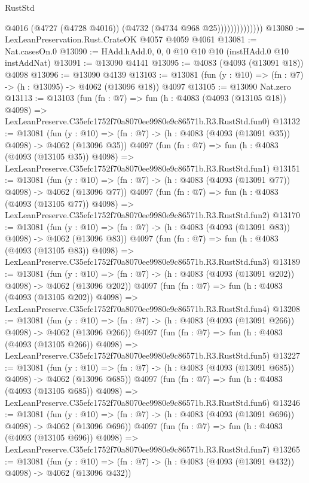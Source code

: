\begin{lexlean}{RustStd}
\begin{coremodule}
                            @4016
                            (@4727 (@4728 @4016))
                            (@4732 (@4734 @968 @25))))))))))))))
@13080 := LexLeanPreservation.Rust.CrateOK @4057 @4059 @4061
@13081 := Nat.casesOn.{0}
@13090 := HAdd.hAdd.{0, 0, 0} @10 @10 @10 (instHAdd.{0} @10 instAddNat)
@13091 := @13090 @4141
@13095 := @4083 (@4093 (@13091 @18)) @4098
@13096 := @13090 @4139
@13103 := @13081 (fun (y : @10) => (fn : @7) -> (h : @13095) -> @4062 (@13096 @18)) @4097
@13105 := @13090 Nat.zero
@13113 := @13103
    (fun (fn : @7) =>
    fun (h : @4083 (@4093 (@13105 @18)) @4098) =>
    LexLeanPreserve.C35efc1752f70a8070ee9980e9c86571b.R3.RustStd.fun0)
@13132 := @13081
    (fun (y : @10) => (fn : @7) -> (h : @4083 (@4093 (@13091 @35)) @4098) -> @4062 (@13096 @35))
    @4097
    (fun (fn : @7) =>
    fun (h : @4083 (@4093 (@13105 @35)) @4098) =>
    LexLeanPreserve.C35efc1752f70a8070ee9980e9c86571b.R3.RustStd.fun1)
@13151 := @13081
    (fun (y : @10) => (fn : @7) -> (h : @4083 (@4093 (@13091 @77)) @4098) -> @4062 (@13096 @77))
    @4097
    (fun (fn : @7) =>
    fun (h : @4083 (@4093 (@13105 @77)) @4098) =>
    LexLeanPreserve.C35efc1752f70a8070ee9980e9c86571b.R3.RustStd.fun2)
@13170 := @13081
    (fun (y : @10) => (fn : @7) -> (h : @4083 (@4093 (@13091 @83)) @4098) -> @4062 (@13096 @83))
    @4097
    (fun (fn : @7) =>
    fun (h : @4083 (@4093 (@13105 @83)) @4098) =>
    LexLeanPreserve.C35efc1752f70a8070ee9980e9c86571b.R3.RustStd.fun3)
@13189 := @13081
    (fun (y : @10) => (fn : @7) -> (h : @4083 (@4093 (@13091 @202)) @4098) -> @4062 (@13096 @202))
    @4097
    (fun (fn : @7) =>
    fun (h : @4083 (@4093 (@13105 @202)) @4098) =>
    LexLeanPreserve.C35efc1752f70a8070ee9980e9c86571b.R3.RustStd.fun4)
@13208 := @13081
    (fun (y : @10) => (fn : @7) -> (h : @4083 (@4093 (@13091 @266)) @4098) -> @4062 (@13096 @266))
    @4097
    (fun (fn : @7) =>
    fun (h : @4083 (@4093 (@13105 @266)) @4098) =>
    LexLeanPreserve.C35efc1752f70a8070ee9980e9c86571b.R3.RustStd.fun5)
@13227 := @13081
    (fun (y : @10) => (fn : @7) -> (h : @4083 (@4093 (@13091 @685)) @4098) -> @4062 (@13096 @685))
    @4097
    (fun (fn : @7) =>
    fun (h : @4083 (@4093 (@13105 @685)) @4098) =>
    LexLeanPreserve.C35efc1752f70a8070ee9980e9c86571b.R3.RustStd.fun6)
@13246 := @13081
    (fun (y : @10) => (fn : @7) -> (h : @4083 (@4093 (@13091 @696)) @4098) -> @4062 (@13096 @696))
    @4097
    (fun (fn : @7) =>
    fun (h : @4083 (@4093 (@13105 @696)) @4098) =>
    LexLeanPreserve.C35efc1752f70a8070ee9980e9c86571b.R3.RustStd.fun7)
@13265 := @13081
    (fun (y : @10) => (fn : @7) -> (h : @4083 (@4093 (@13091 @432)) @4098) -> @4062 (@13096 @432))

\end{coremodule}
\end{lexlean}
